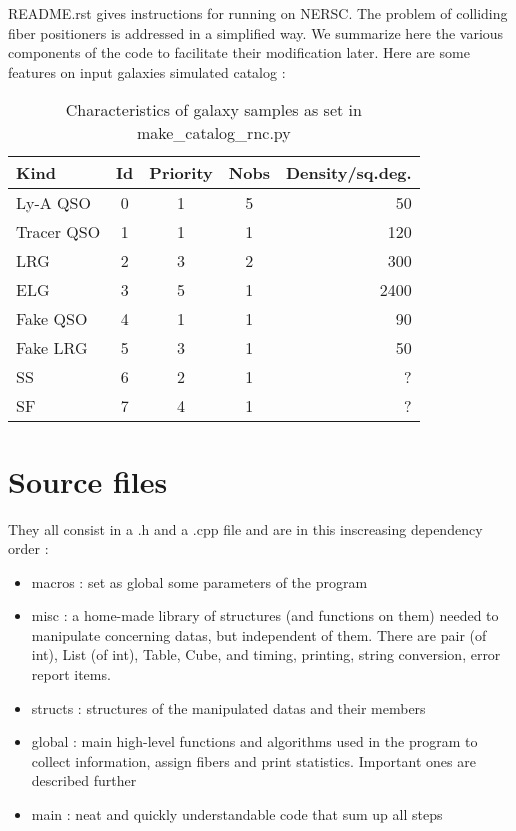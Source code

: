\documentclass{article}
\begin{document}
  
  README.rst gives instructions for running on NERSC.  The problem of colliding fiber positioners is addressed in a simplified way. 
  We summarize here the various components of the code to facilitate their modification later.
Here are some features on input galaxies simulated catalog :

\begin{table}\begin{center}
	\caption{Characteristics of galaxy samples as set in make\_catalog\_rnc.py}\label{tab:characteristics}
	\begin{tabular}{lcccr}\\ \hline
		Kind&Id&Priority&Nobs&Density/sq.deg.\\ \hline
		Ly-A QSO & 0 & 1 & 5 &  50\\
		Tracer QSO & 1 & 1 & 1& 120\\
		LRG & 2 & 3 &2 & 300\\
		ELG & 3 & 5 & 1 & 2400\\
		Fake QSO & 4 & 1 & 1& 90\\
		Fake LRG & 5 & 3 & 1 & 50\\
		SS & 6 & 2 & 1&  ?\\
		SF & 7 & 4 & 1& ?\\ \hline
	\end{tabular}\end{center}
\end{table}


\section{Source files}
They all consist in a .h and a .cpp file and are in this inscreasing dependency order :
\begin{itemize} 
	\item macros : set as global some parameters of the program
	\item misc : a home-made library of structures (and functions on them) needed to manipulate concerning datas, but independent of them. There are pair (of int), List (of int), Table, Cube, and timing, printing, string conversion, error report items.
	\item structs : structures of the manipulated datas and their members
	\item global : main high-level functions and algorithms used in the program to collect information, assign fibers and print statistics. Important ones are described further
	\item main : neat and quickly understandable code that sum up all steps
\end{itemize} 
\end{document}
